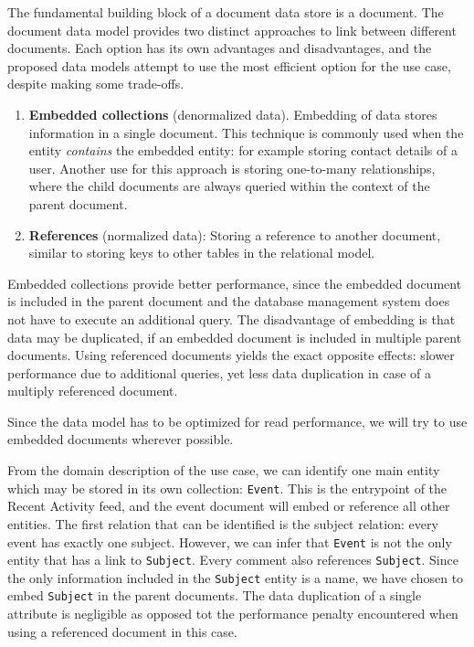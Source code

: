 
The fundamental building block of a document data store is a document.
The document data model provides two distinct approaches to link between different documents.
Each option has its own advantages and disadvantages, and the proposed data models attempt to use the most efficient option for the use case, despite making some trade-offs.

\begin{enumerate}
  \item \textbf{Embedded collections} (denormalized data).
        Embedding of data stores information in a single document.
        This technique is commonly used when the entity \textit{contains} the embedded entity: for example storing contact details of a user.
        Another use for this approach is storing one-to-many relationships, where the child documents are always queried within the context of the parent document.
  \item \textbf{References} (normalized data): Storing a reference to another document, similar to storing keys to other tables in the relational model.
\end{enumerate}

Embedded collections provide better performance, since the embedded document is included in the parent document and the database management system does not have to execute an additional query.
The disadvantage of embedding is that data may be duplicated, if an embedded document is included in multiple parent documents.
Using referenced documents yields the exact opposite effects: slower performance due to additional queries, yet less data duplication in case of a multiply referenced document.

Since the data model has to be optimized for read performance, we will try to use embedded documents wherever possible.

From the domain description of the use case, we can identify one main entity which may be stored in its own collection: \texttt{Event}.
This is the entrypoint of the Recent Activity feed, and the event document will embed or reference all other entities.
The first relation that can be identified is the subject relation: every event has exactly one subject.
However, we can infer that \texttt{Event} is not the only entity that has a link to \texttt{Subject}.
Every comment also references \texttt{Subject}.
Since the only information included in the \texttt{Subject} entity is a name, we have chosen to embed \texttt{Subject} in the parent documents.
The data duplication of a single attribute is negligible as opposed tot the performance penalty encountered when using a referenced document in this case.

